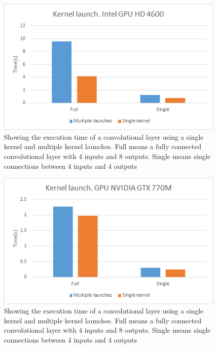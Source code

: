 \documentclass[a4paper,10pt]{article}
\theoremstyle{definition}
\begin{document}
\begin{figure}[H]
	\centering
	\includegraphics{IntelKernelLaunch}
	\caption{Showing the execution time of a convolutional layer using a single kernel and multiple kernel launches. Full means a fully connected convolutional layer with 4 inputs and 8 outputs. Single means single connections between 4 inputs and 4 outputs}
	\label{fig:intelGPUKernelLaunch}
\end{figure}
\begin{figure}[H]
	\centering
	\includegraphics{NvidiaGPUKernelLaunch}
	\caption{Showing the execution time of a convolutional layer using a single kernel and multiple kernel launches. Full means a fully connected convolutional layer with 4 inputs and 8 outputs. Single means single connections between 4 inputs and 4 outputs}
	\label{fig:nvidiaGPUKernelLaunch}
\end{figure}
\end{document}
